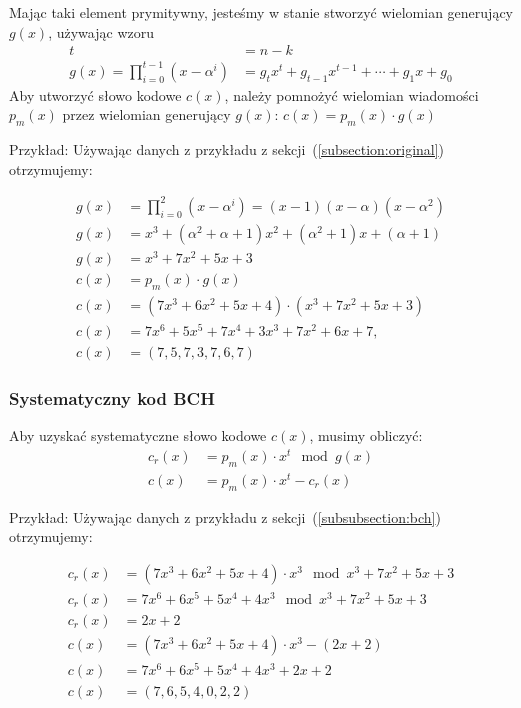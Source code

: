 Mając taki element prymitywny, jesteśmy w stanie stworzyć wielomian generujący $g(x)$, używając wzoru
\begin{align*}
    t &= n - k \\
    g(x) = \prod_{i=0}^{t-1} (x - \alpha^i) &= g_{t}x^t + g_{t-1}x^{t-1} +
    \cdots + g_{1}x + g_{0}
\end{align*}
Aby utworzyć słowo kodowe $c(x)$, należy pomnożyć wielomian wiadomości $p_m(x)$ przez wielomian generujący $g(x)$: $c(x) = p_{m}(x) \cdot g(x)$
\newline
\begin{minipage}{\textwidth}
Przykład:
\newline
Używając danych z przykładu z sekcji~(\ref{subsection:original}) otrzymujemy:
\end{minipage}
\begin{align*}
    g(x) &= \prod_{i=0}^{2} (x - \alpha^i) = (x - 1)(x - \alpha)(x - \alpha^2) \\
    g(x) &= x^3 + (\alpha^2 + \alpha + 1)x^2 + (\alpha^2 + 1)x + (\alpha + 1) \\
    g(x) &= x^3 + 7x^2 + 5x + 3 \\
    c(x) &= p_m(x) \cdot g(x) \\
    c(x) &= (7x^3 + 6x^2 + 5x + 4) \cdot (x^3 + 7x^2 + 5x + 3) \\
    c(x) &= 7x^6 + 5x^5 + 7x^4 + 3x^3 + 7x^2 + 6x + 7, \\
    c(x) &= (7,5,7,3,7,6,7)
\end{align*}

\subsubsection{Systematyczny kod BCH}

Aby uzyskać systematyczne słowo kodowe $c(x)$, musimy obliczyć:
\begin{align*}
    c_r(x) &= p_m(x) \cdot x^t \mod g(x) \\
    c(x) &= p_m(x) \cdot x^t - c_r(x)
\end{align*}
\begin{minipage}{\textwidth}
Przykład:
\newline
Używając danych z przykładu z sekcji~(\ref{subsubsection:bch}) otrzymujemy:
\end{minipage}
\begin{align*}
    c_r(x) &= (7x^3 + 6x^2 + 5x + 4) \cdot x^3 \mod x^3 + 7x^2 + 5x + 3 \\
    c_r(x) &= 7x^6 + 6x^5 + 5x^4 + 4x^3 \mod x^3 + 7x^2 + 5x + 3 \\
    c_r(x) &= 2x + 2 \\
    c(x) &= (7x^3 + 6x^2 + 5x + 4) \cdot x^3 - (2x + 2) \\
    c(x) &= 7x^6 + 6x^5 + 5x^4 + 4x^3 + 2x + 2 \\
    c(x) &= (7,6,5,4,0,2,2)
\end{align*}

